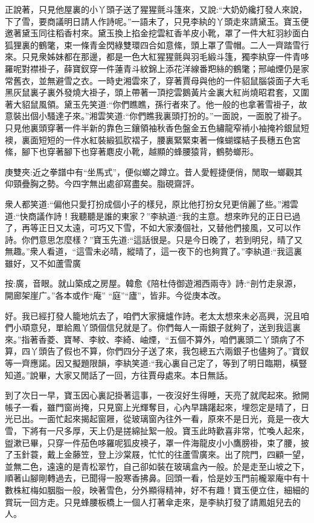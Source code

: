 \begin{parag}
    正說著，只見他屋裏的小丫頭子送了猩猩氈斗篷來，又說:“大奶奶纔打發人來說，下了雪，要商議明日請人作詩呢。”一語未了，只見李紈的丫頭走來請黛玉。寶玉便邀著黛玉同往稻香村來。黛玉換上掐金挖雲紅香羊皮小靴，罩了一件大紅羽紗面白狐狸裏的鶴氅，束一條青金閃綠雙環四合如意絛，頭上罩了雪帽。二人一齊踏雪行來。只見衆姊妹都在那邊，都是一色大紅猩猩氈與羽毛緞斗篷，獨李紈穿一件青哆羅呢對襟褂子，薛寶釵穿一件蓮青斗紋錦上添花洋線番羓絲的鶴氅；邢岫煙仍是家常舊衣，並無避雪之衣。一時史湘雲來了，穿著賈母與他的一件貂鼠腦袋面子大毛黑灰鼠裏子裏外發燒大褂子，頭上帶著一頂挖雲鵝黃片金裏大紅尚燒昭君套，又圍著大貂鼠風領。黛玉先笑道:“你們瞧瞧，孫行者來了。他一般的也拿著雪褂子，故意裝出個小騷達子來。”湘雲笑道:“你們瞧我裏頭打扮的。”一面說，一面脫了褂子。只見他裏頭穿著一件半新的靠色三鑲領袖秋香色盤金五色繡龍窄褃小袖掩衿銀鼠短襖，裏面短短的一件水紅裝緞狐肷褶子，腰裏緊緊束著一條蝴蝶結子長穗五色宮絛，腳下也穿著腳下也穿著麀皮小靴，越顯的蜂腰猿背，鶴勢螂形。\begin{note}庚雙夾:近之拳譜中有“坐馬式”，便似螂之蹲立。昔人愛輕捷便俏，閒取一螂觀其仰頸疊胸之勢。今四字無出處卻寫盡矣。脂硯齋評。\end{note}衆人都笑道:“偏他只愛打扮成個小子的樣兒，原比他打扮女兒更俏麗了些。”湘雲道:“快商議作詩！我聽聽是誰的東家？”李紈道:“我的主意。想來昨兒的正日已過了，再等正日又太遠，可巧又下雪，不如大家湊個社，又替他們接風，又可以作詩。你們意思怎麼樣？”寶玉先道:“這話很是。只是今日晚了，若到明兒，晴了又無趣。”衆人看道，“這雪未必晴，縱晴了，這一夜下的也夠賞了。”李紈道:“我這裏雖好，又不如蘆雪廣 \begin{subnote}按:廣，音眼。就山築成之房屋。韓愈《陪杜侍御遊湘西兩寺》詩:“剖竹走泉源，開廊架崖广。”各本或作“庵” “庭”“廬”，皆非。今從庚本改。\end{subnote}好。我已經打發人籠地炕去了，咱們大家擁爐作詩。老太太想來未必高興，況且咱們小頑意兒，單給鳳丫頭個信兒就是了。你們每人一兩銀子就夠了，送到我這裏來。”指著香菱、寶琴、李紋、李綺、岫煙，“五個不算外，咱們裏頭二丫頭病了不算，四丫頭告了假也不算，你們四分子送了來，我包總五六兩銀子也儘夠了。”寶釵等一齊應諾。因又擬題限韻，李紈笑道:“我心裏自己定了，等到了明日臨期，橫豎知道。”說畢，大家又閒話了一回，方往賈母處來。本日無話。
\end{parag}


\begin{parag}
    到了次日一早，寶玉因心裏記掛著這事，一夜沒好生得睡，天亮了就爬起來。掀開帳子一看，雖門窗尚掩，只見窗上光輝奪目，心內早躊躇起來，埋怨定是晴了，日光已出。一面忙起來揭起窗屜，從玻璃窗內往外一看，原來不是日光，竟是一夜大雪，下將有一尺多厚，天上仍是搓綿扯絮一般。寶玉此時歡喜非常，忙喚人起來，盥漱已畢，只穿一件茄色哆羅呢狐皮襖子，罩一件海龍皮小小鷹膀褂，束了腰，披了玉針蓑，戴上金藤笠，登上沙棠屐，忙忙的往蘆雪廣來。出了院門，四顧一望，並無二色，遠遠的是青松翠竹，自己卻如裝在玻璃盒內一般。於是走至山坡之下，順著山腳剛轉過去，已聞得一股寒香拂鼻。回頭一看，恰是妙玉門前櫳翠庵中有十數株紅梅如胭脂一般，映著雪色，分外顯得精神，好不有趣！寶玉便立住，細細的賞玩一回方走。只見蜂腰板橋上一個人打著傘走來，是李紈打發了請鳳姐兒去的人。
\end{parag}


